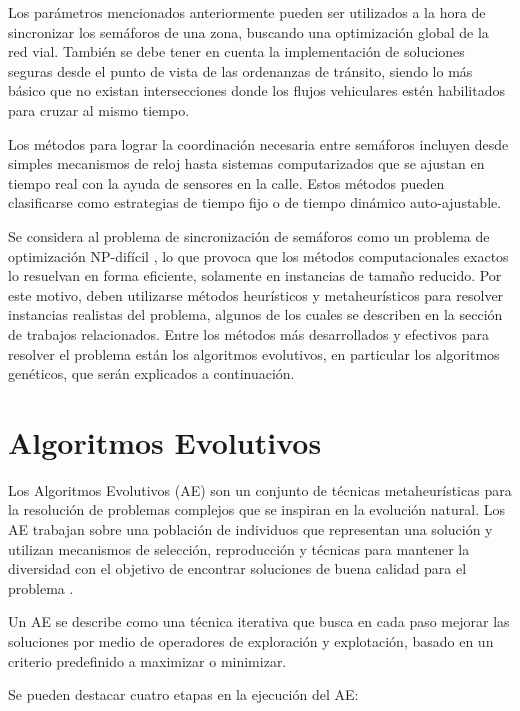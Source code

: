 Los parámetros mencionados anteriormente pueden ser utilizados a la hora de sincronizar los semáforos de una zona, buscando una optimización global de la red vial. También se debe tener en cuenta la implementación de soluciones seguras desde el punto de vista de las ordenanzas de tránsito, siendo lo más básico que no existan intersecciones donde los flujos vehiculares estén habilitados para cruzar al mismo tiempo.

Los métodos para lograr la coordinación necesaria entre semáforos incluyen desde simples mecanismos de reloj hasta sistemas computarizados que se ajustan en tiempo real con la ayuda de sensores en la calle. Estos métodos pueden clasificarse como estrategias de tiempo fijo o de tiempo dinámico auto-ajustable.

Se considera al problema de sincronización de semáforos como un problema de optimización NP-difícil \citep{yang1996model}, lo que provoca que los métodos computacionales exactos lo resuelvan en forma eficiente, solamente en instancias de tamaño reducido. Por este motivo, deben utilizarse métodos heurísticos y metaheurísticos para resolver instancias realistas del problema, algunos de los cuales se describen en la sección de trabajos relacionados. Entre los métodos más desarrollados y efectivos para resolver el problema están los algoritmos evolutivos, en particular los algoritmos genéticos, que serán explicados a continuación.

\section{Algoritmos Evolutivos}

Los Algoritmos Evolutivos (AE) son un conjunto de técnicas metaheurísticas para la resolución de problemas complejos que se inspiran en la evolución natural. Los AE trabajan sobre una población de individuos que representan una solución y utilizan mecanismos de selección, reproducción y técnicas para mantener la diversidad con el objetivo de encontrar soluciones de buena calidad para el problema \citep{spears2000evolutionary}. 

Un AE se describe como una técnica iterativa que busca en cada paso mejorar las soluciones por medio de operadores de exploración y explotación, basado en un criterio predefinido a maximizar o minimizar.

Se pueden destacar cuatro etapas en la ejecución del AE:

